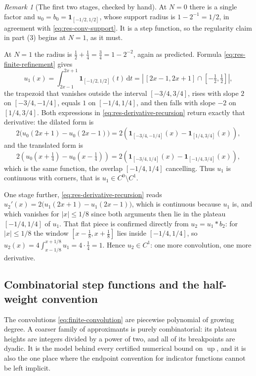 \documentclass[11pt,oneside]{article}
\theoremstyle{definition}
\theoremstyle{remark}
\newtheorem{remark}[theorem]{Remark}
\newcommand{\Up}{\operatorname{up}}
\newcommand{\dd}{\,\mathrm d}
\begin{document}
\begin{remark}[The first two stages, checked by hand]
\label{rem:res-first-stages}
At $N=0$ there is a single factor and $u_0=b_0=\mathbf 1_{[-1/2,1/2]}$, whose support radius
is $1-2^{-1}=1/2$, in agreement with \eqref{eq:res-conv-support}.  It is a step function, so
the regularity claim in part (3) begins at $N=1$, as it must.

At $N=1$ the radius is $\tfrac12+\tfrac14=\tfrac34=1-2^{-2}$, again as predicted.  Formula
\eqref{eq:res-finite-refinement} gives
\[
 u_1(x)=\int_{2x-1}^{2x+1}\mathbf 1_{[-1/2,1/2]}(t)\dd t
 =\left|\,[2x-1,2x+1]\cap\left[-\tfrac12,\tfrac12\right]\right|,
\]
the trapezoid that vanishes outside the interval $[-3/4,3/4]$, rises with slope $2$ on
$[-3/4,-1/4]$, equals $1$ on $[-1/4,1/4]$, and then falls with slope $-2$ on $[1/4,3/4]$.
Both expressions in
\eqref{eq:res-derivative-recursion} return exactly that derivative: the dilated form is
\[
 2\bigl(u_0(2x+1)-u_0(2x-1)\bigr)
 =2\left(\mathbf 1_{[-3/4,-1/4]}(x)-\mathbf 1_{[1/4,3/4]}(x)\right),
\]
and the translated form is
\[
 2\left(u_0\!\left(x+\tfrac14\right)-u_0\!\left(x-\tfrac14\right)\right)
 =2\left(\mathbf 1_{[-3/4,1/4]}(x)-\mathbf 1_{[-1/4,3/4]}(x)\right),
\]
which is the same function, the overlap $[-1/4,1/4]$ cancelling.  Thus $u_1$ is continuous
with corners, that is $u_1\in C^0\setminus C^1$.

One stage further, \eqref{eq:res-derivative-recursion} reads
$u_2'(x)=2\bigl(u_1(2x+1)-u_1(2x-1)\bigr)$, which is continuous because $u_1$ is, and which
vanishes for $|x|\le1/8$ since both arguments then lie in the plateau $[-1/4,1/4]$ of $u_1$.
That flat piece is confirmed directly from $u_2=u_1*b_2$: for $|x|\le1/8$ the window
$[x-\tfrac18,x+\tfrac18]$ lies inside $[-1/4,1/4]$, so
$u_2(x)=4\int_{x-1/8}^{x+1/8}u_1=4\cdot\tfrac14=1$.  Hence $u_2\in C^1$: one more
convolution, one more derivative.
\end{remark}

\subsection{Combinatorial step functions and the half-weight convention}

The convolutions \eqref{eq:finite-convolution} are piecewise polynomial of growing degree.
A coarser family of approximants is purely combinatorial: its plateau heights are integers
divided by a power of two, and all of its breakpoints are dyadic.  It is the model behind
every certified numerical bound on $\Up$, and it is also the one place where the endpoint
convention for indicator functions cannot be left implicit.
\end{document}
